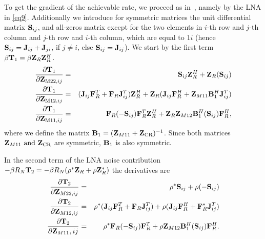 To get the gradient of the achievable rate, we proceed as in~\cite{Yahia2013}, namely
by the LNA in  \eqref{eq9}.
Additionally we introduce for symmetric matrices the unit differential matrix $\mathbf{S}_{ij}$, and all-zeros matrix except for the two elements in $i$-th row and $j$-th column and $j$-th row and $i$-th column, which are equal to $1i$ (hence $\mathbf{S}_{ij} = \mathbf{J}_{ij} + \mathbf{J}_{ji}$, if $j\neq i$, else $\mathbf{S}_{ij} = \mathbf{J}_{ij}$). We start by the first term  $\beta\mathbf{T}_1=\beta \mathbf{Z}_R\mathbf{Z}_R^H$. 
\begin{eqnarray}
\frac{\partial \mat{T}_1}{\partial \mat{Z}_{\text{M22,}ij}}&=& 
	\mat{S}_{ij}\mat{Z}_R^H+\mat{Z}_R(\mat{S}_{ij}) \nonumber\\
\frac{\partial \mat{T}_1}{\partial \mat{Z}_{\text{M12,}ij}}&=& 
	(\mat{J}_{ij}\mat{F}_R^T+\mat{F}_R\mat{J}_{ij}^T)\mat{Z}_R^H+ %
\mat{Z}_R(\mat{J}_{ij}\mat{F}_R^H+\mat{Z}_{M11}\mat{B}_1^H\mat{J}_{ij}^T)  \nonumber \\
\frac{\partial \mat{T}_1}{\partial \mat{Z}_{\text{M11,}ij}}&=&
	\mat{F}_R(-\mat{S}_{ij})\mat{F}_R^T \mat{Z}_R^H +
	\mat{Z}_R\mat{Z}_{M12}\mat{B}_1^H(\mat{S}_{ij})\mat{F}_R^H,
\label{Shorteneddeirvatives}
\end{eqnarray}
where we define the matrix $\mathbf{B}_1=(\mathbf{Z}_{M11}+\mathbf{Z}_{\text{CR}})^{-1}$. Since both matrices $\mathbf{Z}_{M11}\text{ and }\mathbf{Z}_{\text{CR}}$ are symmetric, $\mathbf{B}_1$ is also symmetric.


In the second term of the LNA noise contribution $-\beta R_N\mathbf{T}_2=-\beta R_N(\rho^*\mathbf{Z}_R+\rho\mathbf{Z}_R^*)$ the derivatives are
\begin{eqnarray}
\frac{\partial \mathbf{T}_2}{\partial \mathbf{Z}_{M22,ij}}&=&
	\rho^*\mathbf{S}_{ij}+\rho (-\mathbf{S}_{ij}) \nonumber \\
\frac{\partial \mathbf{T}_2}{\partial \mathbf{Z}_{M12,ij}}&=&
	\rho^*(\mathbf{J}_{ij}\mathbf{F}_R^T+\mathbf{F}_R\mathbf{J}_{ij}^T)+ 
	\rho(\mathbf{J}_{ij}\mathbf{F}_R^{H}+\mathbf{F}_R^{*}\mathbf{J}_{ij}^T) \nonumber\\
\frac{\partial \mathbf{T}_2}{\partial \mathbf{Z}_{M11},ij}&=&
	\rho^*\mathbf{F}_R(-\mathbf{S}_{ij})\mathbf{F}_R^{T}+ 
	\rho \mathbf{Z}_{M12}\mathbf{B}_1^H(\mathbf{S}_{ij})\mathbf{F}_R^H.
\label{ShortenedpartialZ}
\end{eqnarray}


